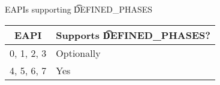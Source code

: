 
\begin{centertable}{EAPIs supporting \t{DEFINED_PHASES}}
    \label{tab:defined-phases-table}
    \begin{tabular}{ll}
      \toprule
      \multicolumn{1}{c}{\textbf{EAPI}} &
      \multicolumn{1}{c}{\textbf{Supports \t{DEFINED_PHASES}?}} \\
      \midrule
      0, 1, 2, 3        & Optionally \\
      4, 5, 6, 7        & Yes        \\
      \bottomrule
    \end{tabular}
\end{centertable}


